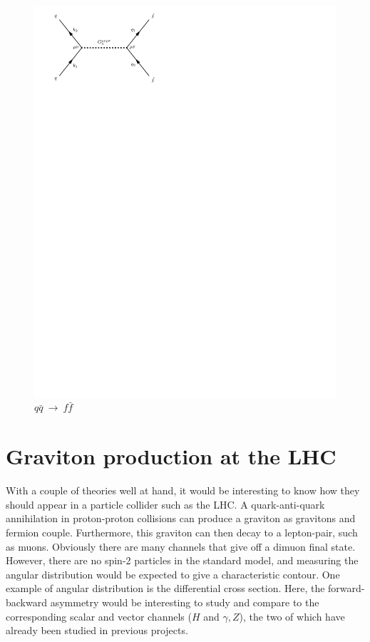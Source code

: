 \documentclass[11pt,a4paper]{article}
\begin{document}
\begin{figure}[H]
	\centering
	\includegraphics[trim={0.5cm 22cm 11.5cm 0cm},scale=1]{feynGraphs/qqbar_G_ffbar}
	\caption{$q\bar{q}\:\rightarrow\:f\bar{f}$}
	\label{fig:gravitonChannel}
\end{figure}

\section{Graviton production at the LHC}
With a couple of theories well at hand, it would be interesting to know how they should appear in a particle collider such as the LHC. A quark-anti-quark annihilation in proton-proton collisions can produce a graviton as gravitons and fermion couple. Furthermore, this graviton can then decay to a lepton-pair, such as muons. Obviously there are many channels that give off a dimuon final state. However, there are no spin-2 particles in the standard model, and measuring the angular distribution would be expected to give a characteristic contour. One example of angular distribution is the differential cross section. Here, the forward-backward asymmetry would be interesting to study and compare to the corresponding scalar and vector channels ($H$ and $\gamma,Z$), the two of which have already been studied in previous projects.
\end{document}
